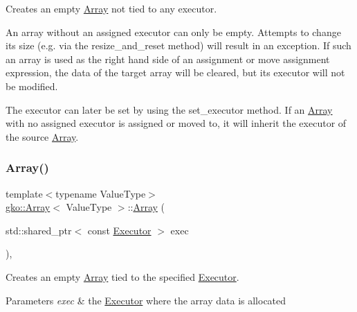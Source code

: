 Creates an empty \hyperlink{classgko_1_1Array}{Array} not tied to any executor. 

An array without an assigned executor can only be empty. Attempts to change its size (e.\+g. via the resize\+\_\+and\+\_\+reset method) will result in an exception. If such an array is used as the right hand side of an assignment or move assignment expression, the data of the target array will be cleared, but its executor will not be modified.

The executor can later be set by using the set\+\_\+executor method. If an \hyperlink{classgko_1_1Array}{Array} with no assigned executor is assigned or moved to, it will inherit the executor of the source \hyperlink{classgko_1_1Array}{Array}. \mbox{\label{classgko_1_1Array_ae64e4c698ecef2cfbe3ceb3dfd07dbaf}} 
\subsubsection{\texorpdfstring{Array()}{Array()}\hspace{0.1cm}{\footnotesize\ttfamily [2/11]}}
{\footnotesize\ttfamily template$<$typename Value\+Type$>$ \\
\hyperlink{classgko_1_1Array}{gko\+::\+Array}$<$ Value\+Type $>$\+::\hyperlink{classgko_1_1Array}{Array} (\begin{DoxyParamCaption}\item[{std\+::shared\+\_\+ptr$<$ const \hyperlink{classgko_1_1Executor}{Executor} $>$}]{exec }\end{DoxyParamCaption})\hspace{0.3cm}{\ttfamily [inline]}, {\ttfamily [noexcept]}}



Creates an empty \hyperlink{classgko_1_1Array}{Array} tied to the specified \hyperlink{classgko_1_1Executor}{Executor}. 


\begin{DoxyParams}{Parameters}
{\em exec} & the \hyperlink{classgko_1_1Executor}{Executor} where the array data is allocated \\
\hline
\end{DoxyParams}
\mbox{\label{classgko_1_1Array_a2cf49c2f39cbad160982d731fcf74031}} 
